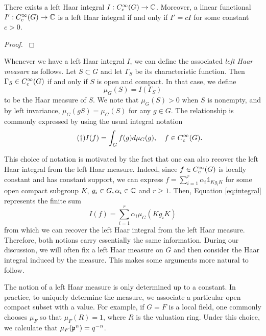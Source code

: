 \begin{prop}\label{prop:haar}
    There exists a left Haar integral $I:C_c^{\infty}(G)\to\mathbb{C}$. Moreover, a linear functional $I':C_c^{\infty}(G)\to\mathbb{C}$ is a left Haar integral if and only if $I'=cI$ for some constant $c>0$.
\end{prop}
\begin{proof}
    
    \cite[Proposition 3.1]{BH1}
\end{proof}

Whenever we have a left Haar integral $I$, we can define the associated \textit{left Haar measure} as follows. Let $S\subset G$ and let $\Gamma_S$ be its characteristic function. Then $\Gamma_S\in C_c^{\infty}(G)$ if and only if $S$ is open and compact. In that case, we define $$\mu_G(S)=I(\Gamma_S)$$ to be the Haar measure of $S$. We note that $\mu_G(S)>0$ when $S$ is nonempty, and by left invariance, $\mu_G(gS)=\mu_G(S)$ for any $g\in G$. The relationship is commonly expressed by using the usual integral notation
\begin{equation}\tag{$\dagger$}\label{eq:integral}
    I(f)=\int_G f(g)d\mu_G(g),\quad f\in C_c^{\infty}(G).
\end{equation}

This choice of notation is motivated by the fact that one can also recover the left Haar integral from the left Haar measure. Indeed, since $f\in C_c^{\infty}(G)$ is locally constant and has constant support, we can express $f=\sum_{i=1}^r\alpha_i\mathds{1}_{Kg_iK}$ for some open compact subgroup $K$, $g_i\in G, \alpha_i\in\mathbb{C}$ and $r\geq 1$. Then, Equation \ref{eq:integral} represents the finite sum 
$$I(f)=\sum_{i=1}^r\alpha_i\mu_G(Kg_iK)$$
from which we can recover the left Haar integral from the left Haar measure. Therefore, both notions carry essentially the same information. During our discussion, we will often fix a left Haar measure on $G$ and then consider the Haar integral induced by the measure. This makes some arguments more natural to follow.

\begin{example}
    The notion of a left Haar measure is only determined up to a constant. In practice, to uniquely determine the measure, we associate a particular open compact subset with a value. For example, if $G=F$ is a local field, one commonly chooses $\mu_F$ so that $\mu_F(R)=1$, where $R$ is the valuation ring. Under this choice, we calculate that $\mu_F(\mathfrak{p}^n)=q^{-n}$.
\end{example}

